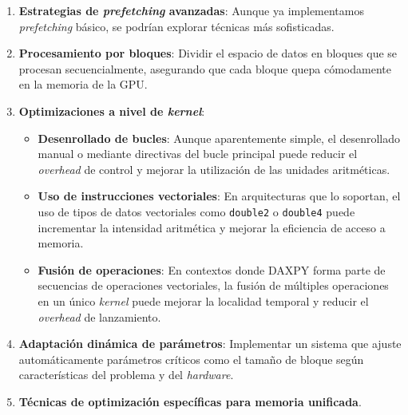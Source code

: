             \begin{enumerate}
            
                \item \textbf{Estrategias de \textit{prefetching} avanzadas}: Aunque ya implementamos \textit{prefetching} básico, se podrían explorar técnicas más sofisticadas.
                
                \item \textbf{Procesamiento por bloques}: Dividir el espacio de datos en bloques que se procesan secuencialmente, asegurando que cada bloque quepa cómodamente en la memoria de la GPU.
                
                \item \textbf{Optimizaciones a nivel de \textit{kernel}}:
                
                    \begin{itemize}
                    
                        \item \textbf{Desenrollado de bucles}: Aunque aparentemente simple, el desenrollado manual o mediante directivas del bucle principal puede reducir el \textit{overhead} de control y mejorar la utilización de las unidades aritméticas.
                               
                        \item \textbf{Uso de instrucciones vectoriales}: En arquitecturas que lo soportan, el uso de tipos de datos vectoriales como \texttt{double2} o \texttt{double4} puede incrementar la intensidad aritmética y mejorar la eficiencia de acceso a memoria.
                        
                        \item \textbf{Fusión de operaciones}: En contextos donde DAXPY forma parte de secuencias de operaciones vectoriales, la fusión de múltiples operaciones en un único \textit{kernel} puede mejorar la localidad temporal y reducir el \textit{overhead} de lanzamiento.
                        
                    \end{itemize}
                
                \item \textbf{Adaptación dinámica de parámetros}: Implementar un sistema que ajuste automáticamente parámetros críticos como el tamaño de bloque según características del problema y del \textit{hardware}.
                       
                \item \textbf{Técnicas de optimización específicas para memoria unificada}.
                

\end{enumerate}
